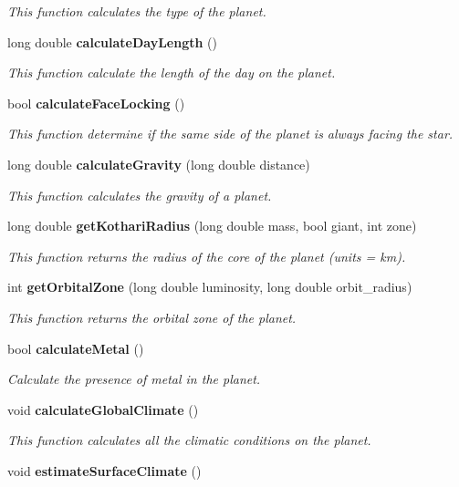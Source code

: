 \begin{CompactItemize}
\begin{CompactList}\small\item\em This function calculates the type of the planet. \item\end{CompactList}\item 
long double {\bf calculate\-Day\-Length} ()
\begin{CompactList}\small\item\em This function calculate the length of the day on the planet. \item\end{CompactList}\item 
bool {\bf calculate\-Face\-Locking} ()
\begin{CompactList}\small\item\em This function determine if the same side of the planet is always facing the star. \item\end{CompactList}\item 
long double {\bf calculate\-Gravity} (long double distance)
\begin{CompactList}\small\item\em This function calculates the gravity of a planet. \item\end{CompactList}\item 
long double {\bf get\-Kothari\-Radius} (long double mass, bool giant, int zone)
\begin{CompactList}\small\item\em This function returns the radius of the core of the planet (units = km). \item\end{CompactList}\item 
int {\bf get\-Orbital\-Zone} (long double luminosity, long double orbit\_\-radius)
\begin{CompactList}\small\item\em This function returns the orbital zone of the planet. \item\end{CompactList}\item 
bool {\bf calculate\-Metal} ()
\begin{CompactList}\small\item\em Calculate the presence of metal in the planet. \item\end{CompactList}\item 
void {\bf calculate\-Global\-Climate} ()
\begin{CompactList}\small\item\em This function calculates all the climatic conditions on the planet. \item\end{CompactList}\item 
void {\bf estimate\-Surface\-Climate} ()\label{class_s_g___planet_b14}


\end{CompactItemize}
